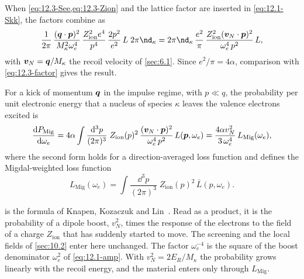 When \cref{eq:12.3-See,eq:12.3-Zion} and the lattice factor are inserted in \cref{eq:12.1-Skk}, the factors combine as
\begin{equation*}
  \frac{1}{2\pi}\,\frac{(\vect{q}\cdot\vect{p})^2}{M_\kappa^2\omega_e^4}\,\frac{Z_{\mathrm{ion}}^2e^4}{p^4}\,\frac{2p^2}{e^2}\,L\;2\pi\nd_\kappa
  = 2\pi\nd_\kappa\,\frac{e^2}{\pi}\,\frac{Z_{\mathrm{ion}}^2(\vect{v}_N\cdot\vect{p})^2}{\omega_e^4\,p^2}\,L ,
\end{equation*}
with $\bm{v}_N = \bm{q}/M_\kappa$ the recoil velocity of \cref{sec:6.1}. Since $e^2/\pi = 4\alpha$, comparison with \cref{eq:12.3-factor} gives the result.
\begin{keyresult}
For a kick of momentum $\bm{q}$ in the impulse regime, with $p \ll q$, the probability per unit electronic energy that a nucleus of species $\kappa$ leaves the valence electrons excited is
\begin{equation}
  \frac{\mathrm{d} P_{\mathrm{Mig}}}{\mathrm{d}\omega_e} = 4\alpha\int\frac{\mathrm{d}^3p}{(2\pi)^3}\;Z_{\mathrm{ion}}(p)^2\,\frac{(\bm{v}_N\cdot\bm{p})^2}{\omega_e^4\,p^2}\,L(\bm{p},\omega_e)
  = \frac{4\alpha v_N^2}{3\,\omega_e^4}\,L_{\mathrm{Mig}}(\omega_e) ,
  \label{eq:12.3-soft}
\end{equation}
where the second form holds for a direction-averaged loss function and defines the Migdal-weighted loss function
\begin{equation}
  L_{\mathrm{Mig}}(\omega_e) = \int\frac{\dd^3p}{(2\pi)^3}\;Z_{\mathrm{ion}}(p)^2\,\bar L(p,\omega_e) .
  \label{eq:12.3-LMig}
\end{equation}
\end{keyresult}
\noindent {} is the formula of Knapen, Kozaczuk and Lin~\cite[Eq.~(6)]{knapen2021migdal}. Read as a product, it is the probability of a dipole boost, $v_N^2$, times the response of the electrons to the field of a charge $Z_{\mathrm{ion}}$ that has suddenly started to move. The screening and the local fields of \cref{sec:10.2} enter here unchanged. The factor $\omega_e^{-4}$ is the square of the boost denominator $\omega_e^2$ of \cref{eq:12.1-amp}. With $v_N^2 = 2E_R/M_\kappa$ the probability grows linearly with the recoil energy, and the material enters only through $L_{\mathrm{Mig}}$.

